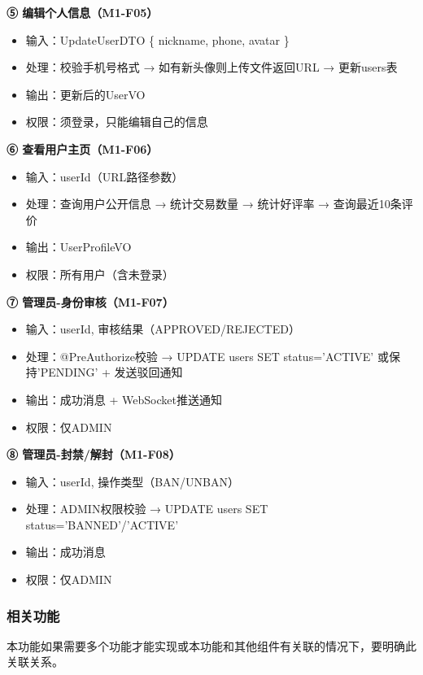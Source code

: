 \documentclass[12pt,a4paper]{ctexart}
\numberwithin{figure}{section}
\numberwithin{table}{section}
\begin{document}
\textbf{⑤ 编辑个人信息（M1-F05）}

\begin{itemize}
    \item 输入：UpdateUserDTO \{ nickname, phone, avatar \}
    \item 处理：校验手机号格式 → 如有新头像则上传文件返回URL → 更新users表
    \item 输出：更新后的UserVO
    \item 权限：须登录，只能编辑自己的信息
\end{itemize}

\textbf{⑥ 查看用户主页（M1-F06）}

\begin{itemize}
    \item 输入：userId（URL路径参数）
    \item 处理：查询用户公开信息 → 统计交易数量 → 统计好评率 → 查询最近10条评价
    \item 输出：UserProfileVO
    \item 权限：所有用户（含未登录）
\end{itemize}

\textbf{⑦ 管理员-身份审核（M1-F07）}

\begin{itemize}
    \item 输入：userId, 审核结果（APPROVED/REJECTED）
    \item 处理：@PreAuthorize校验 → UPDATE users SET status='ACTIVE' 或保持'PENDING' + 发送驳回通知
    \item 输出：成功消息 + WebSocket推送通知
    \item 权限：仅ADMIN
\end{itemize}

\textbf{⑧ 管理员-封禁/解封（M1-F08）}

\begin{itemize}
    \item 输入：userId, 操作类型（BAN/UNBAN）
    \item 处理：ADMIN权限校验 → UPDATE users SET status='BANNED'/'ACTIVE'
    \item 输出：成功消息
    \item 权限：仅ADMIN
\end{itemize}

\subsubsection{相关功能}

本功能如果需要多个功能才能实现或本功能和其他组件有关联的情况下，要明确此关联关系。
\end{document}
